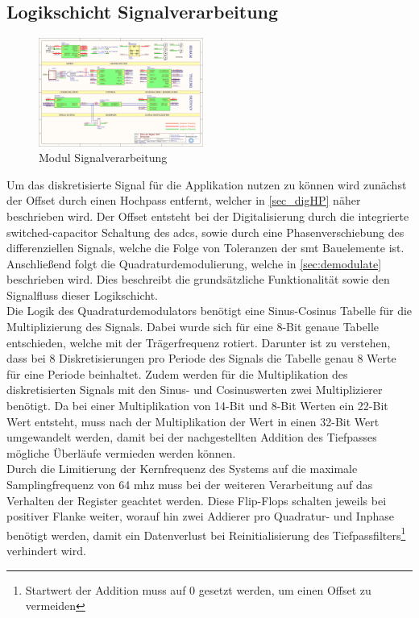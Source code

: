 \subsection{Logikschicht Signalverarbeitung}
\begin{figure}[h!]
	\centering
	\includegraphics[page=11,width=0.48\textwidth, trim=169mm 96mm 66mm 74mm, clip=true]{images/pcb/new.PDF}%
	\caption{Modul Signalverarbeitung}
	\label{fig:layer_demod}
\end{figure}
Um das diskretisierte Signal für die Applikation nutzen zu können wird zunächst der Offset durch einen Hochpass entfernt, welcher in \autoref{sec_digHP} näher beschrieben wird. Der Offset entsteht bei der Digitalisierung durch die integrierte switched-capacitor Schaltung des \ac{adc}s, sowie durch eine Phasenverschiebung des differenziellen Signals, welche die Folge von Toleranzen der \ac{smt} Bauelemente ist. Anschließend folgt die Quadraturdemodulierung, welche in \autoref{sec:demodulate} beschrieben wird. Dies beschreibt die grundsätzliche Funktionalität sowie den Signalfluss dieser Logikschicht.\\
Die Logik des Quadraturdemodulators benötigt eine Sinus-Cosinus Tabelle für die Multiplizierung des Signals. Dabei wurde sich für eine 8-Bit genaue Tabelle entschieden, welche mit der Trägerfrequenz rotiert. Darunter ist zu verstehen, dass bei 8 Diskretisierungen pro Periode des Signals die Tabelle genau 8 Werte für eine Periode beinhaltet. Zudem werden für die Multiplikation des diskretisierten Signals mit den Sinus- und Cosinuswerten zwei Multiplizierer benötigt. Da bei einer Multiplikation von 14-Bit und 8-Bit Werten ein 22-Bit Wert entsteht, muss nach der Multiplikation der Wert in einen 32-Bit Wert umgewandelt werden, damit bei der nachgestellten Addition des Tiefpasses mögliche Überläufe vermieden werden können.\\
Durch die Limitierung der Kernfrequenz des Systems auf die maximale Samplingfrequenz von 64 \ac{mhz} muss bei der weiteren Verarbeitung auf das Verhalten der Register geachtet werden. Diese Flip-Flops schalten jeweils bei positiver Flanke weiter, worauf hin zwei Addierer pro Quadratur- und Inphase benötigt werden, damit ein Datenverlust bei Reinitialisierung des Tiefpassfilters\footnote{Startwert der Addition muss auf 0 gesetzt werden, um einen Offset zu vermeiden} verhindert wird. 
